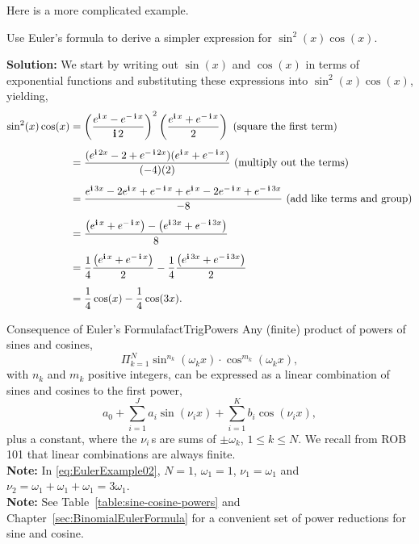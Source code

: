 \Qed

Here is a more complicated example.

\begin{example}
 Use Euler's formula to derive a simpler expression for $\sin^2(x)\cos(x)$. 
\end{example}

\textbf{Solution:}
We start by writing out $\sin(x)$ and $\cos(x)$ in terms of exponential functions and substituting these expressions into $\sin^2(x)\cos(x)$, yielding,
\begin{equation}
\label{eq:EulerExample02}
    \setlength{\jot}{8pt}
\begin{aligned}
    \sin^2(x)\cos(x) &= \left(\frac{e^{\im x} - e^{-\im x}}{\im 2 }\right)^2 \left(\frac{e^{\im x} + e^{-\im x}}{2} \right) \text{ (square the first term)}\\
    &= \frac{(e^{\im 2  x} - 2 + e^{-\im 2  x})(e^{\im x} + e^{-\im x})}{(-4) (2)} \text{ (multiply out the terms)}\\
    &=  \frac{e^{\im 3  x} - 2e^{\im x} + e^{-\im x} +e^{\im x} -2 e^{-\im x}+ e^{-\im 3  x}}{-8} \text{ (add like terms and group)}\\
    &= \frac{ \left( e^{\im x} + e^{-\im x}\right) - \left(e^{\im 3  x} + e^{-\im 3  x}   \right)}{8} \\
    &= \frac{1}{4} \frac{ \left( e^{\im x} + e^{-\im x} \right) }{2}  - \frac{1}{4} \frac{ \left(e^{\im 3  x} + e^{-\im 3  x} \right)}{2}\\
     &= \frac{1}{4}  \cos(x) - \frac{1}{4} \cos(3x).
\end{aligned}
\end{equation}
\Qed


\begin{factColor}{Consequence of Euler's Formula}{factTrigPowers}
Any (finite) product of powers of sines and cosines,
\begin{equation}
\Pi_{k=1}^N \sin^{n_k}(\omega_k x) \cdot \cos^{m_k}(\omega_k x),
\end{equation}
with $n_k$ and $m_k$ positive integers, can be expressed as a linear combination of sines and cosines to the first power, 
\begin{equation}
   a_0 + \sum_{i=1}^J a_i \sin(\nu_i   x) +  \sum_{i=1}^K b_i \cos(\nu_i   x),
\end{equation} 
plus a constant, where the $\nu_i$\,s are sums of $\pm \omega_k$, $1 \le k \le N$. We recall from ROB 101 that linear combinations are always finite.\\

\textbf{Note:} In \eqref{eq:EulerExample02}, $N=1$, $\omega_1=1$, $\nu_1 = \omega_1$ and  $\nu_2 = \omega_1 + \omega_1 + \omega_1 = 3 \omega_1$. \\

\textbf{Note:} See Table~\ref{table:sine-cosine-powers} and Chapter~\ref{sec:BinomialEulerFormula} for a convenient set of power reductions for sine and cosine. 
\end{factColor}

